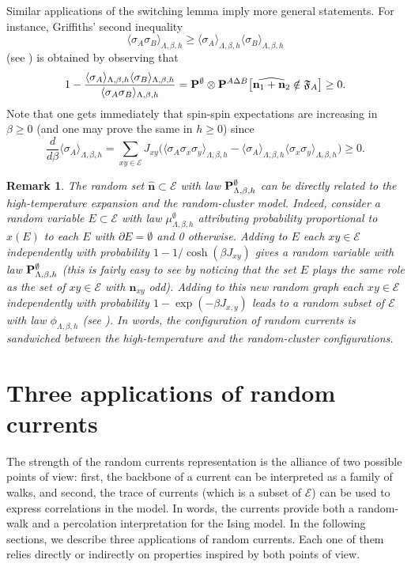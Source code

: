 \documentclass[a4paper,oneside,11pt]{article}
\newtheorem{remark}[theorem]{Remark}
\newcommand{\ee}{\end{equation}}
\newcommand{\be}{\begin{equation}}
\begin{document}
Similar applications of the switching lemma imply more general statements. For instance, Griffiths' second inequality 
$$
\langle \sigma_A\sigma_B\rangle_{\Lambda,\beta,h}\ge \langle\sigma_A\rangle_{\Lambda,\beta,h}\langle\sigma_B\rangle_{\Lambda,\beta,h}$$ (see \cite{Gri67})
is obtained by observing that
\be\nonumber
1-\frac{\langle\sigma_A\rangle_{\Lambda,\beta,h}\langle\sigma_B\rangle_{\Lambda,\beta,h}}{\langle \sigma_A\sigma_B\rangle_{\Lambda,\beta,h}}={\bf P}^\emptyset\otimes{\bf P}^{A\Delta B}\big[\widehat{{\mathbf n}_1+{\mathbf n}_2}\notin \mathfrak F_A\big]\ge0.
\ee
Note that one gets immediately that spin-spin expectations are increasing in $\beta\ge0$ (and one may prove the same in $h\ge0$) since
\be\nonumber
\frac{d}{d\beta}\langle\sigma_A\rangle_{\Lambda,\beta,h}=\sum_{xy\in \mathcal E}J_{xy}\big(\langle\sigma_A\sigma_x\sigma_y\rangle_{\Lambda,\beta,h}-\langle\sigma_A\rangle_{\Lambda,\beta,h}
\langle\sigma_x\sigma_y\rangle_{\Lambda,\beta,h}\big)\ge0.
\ee
\begin{remark}\label{rmk:comparison}
The random set $\widehat{\mathbf{n}}\subset\mathcal E$ with law ${\bf P}^\emptyset_{\Lambda,\beta,h}$ can be directly related to the high-temperature expansion and the random-cluster model. Indeed, consider a random variable $E\subset\mathcal E$ with law $\mu^\emptyset_{\Lambda,\beta,h}$ attributing probability proportional to $x(E)$ to each $E$ with $\partial E=\emptyset$ and 0 otherwise. Adding to $E$ each $xy\in \mathcal E$ independently with probability $1-1/\cosh(\beta J_{xy})$ gives a random variable with law ${\bf P}_{\Lambda,\beta,h}^\emptyset$ (this is fairly easy to see by noticing that the set $E$ plays the same role as the set of $xy\in\mathcal E$ with $\mathbf n_{xy}$ odd). Adding to this new random graph each $xy\in\mathcal E$ independently with probability $1-\exp(-\beta J_{x,y})$ leads to a random subset of $\mathcal E$ with law $\phi_{\Lambda,\beta,h}$ (see \cite{GriJan09,LupWer15}). In words, the configuration of random currents is sandwiched between the high-temperature and the random-cluster configurations.
\end{remark}

\section{Three applications of random currents}

The strength of the random currents representation is the alliance of two possible points of view: first, the backbone of a current can be interpreted as a family of walks, and second, the trace of currents (which is a subset of $\mathcal E$) can be used to express correlations in the model. In words, the currents provide both a random-walk and a percolation interpretation for the Ising model. In the following sections, we describe three applications of random currents. Each one of them relies directly or indirectly on properties inspired by both points of view.
\end{document}
